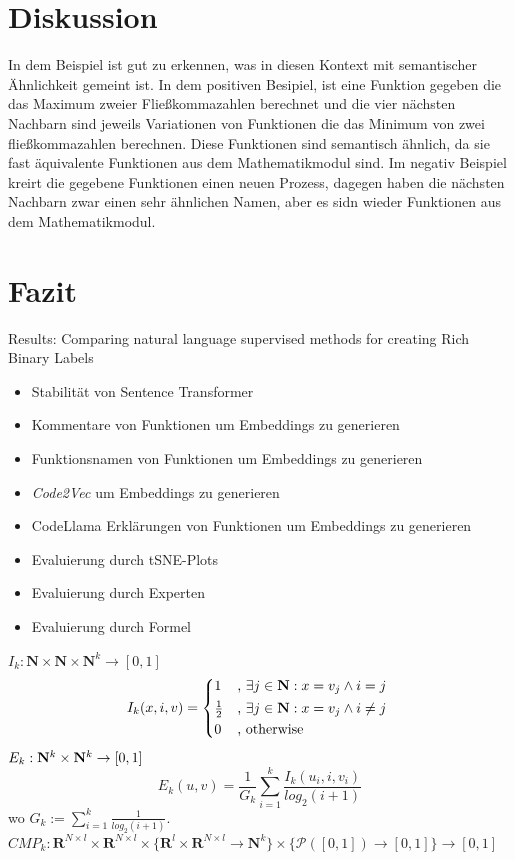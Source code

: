 \documentclass[12pt,letterpaper,ngerman]{article}
\begin{document}
\section{Diskussion}

In dem Beispiel ist gut zu erkennen, was in diesen Kontext mit semantischer
Ähnlichkeit gemeint ist. In dem positiven Besipiel, ist eine Funktion gegeben
die das Maximum zweier Fließkommazahlen berechnet und die vier
nächsten Nachbarn sind jeweils Variationen von Funktionen die das
Minimum von zwei fließkommazahlen berechnen. Diese Funktionen sind
semantisch ähnlich, da sie fast äquivalente Funktionen aus dem
Mathematikmodul sind. Im negativ Beispiel kreirt die 
gegebene Funktionen einen neuen Prozess, dagegen haben die nächsten
Nachbarn zwar einen sehr ähnlichen Namen, aber es sidn wieder Funktionen
aus dem Mathematikmodul.\\
\section{Fazit}

Results: Comparing natural language supervised methods for creating Rich Binary Labels
\begin{itemize}
  \item Stabilität von Sentence Transformer
  \item Kommentare von Funktionen um Embeddings zu generieren
  \item Funktionsnamen von Funktionen um Embeddings zu generieren
  \item \textit{Code2Vec} um Embeddings zu generieren
  \item CodeLlama Erklärungen von Funktionen um Embeddings zu generieren
  \item Evaluierung durch tSNE-Plots
  \item Evaluierung durch Experten
  \item Evaluierung durch Formel
\end{itemize}
$ I_{k}: \mathbf{N} \times \mathbf{N} \times \mathbf{N}^{k} \to [0,1]$
\[ I_{k}(x,i,v) = \begin{cases*} 
1 & , $\exists j \in \mathbf{N}: x = v_j \land i = j$   \\
      \frac{1}{2} & , $\exists j \in \mathbf{N}: x = v_j \land i \neq j$\\
      0   & , \text{otherwise}
                \end{cases*} \]
$E_k: \mathbf{N}^k \times \mathbf{N}^k \to [0,1]$
\[ E_k(u,v) = \frac{1}{G_k} \sum^{k}_{i=1} \frac{I_k(u_i,i,v_i)}{log_2(i+1)}\]
wo $G_k := \sum_{i=1}^{k} \frac{1}{log_2(i+1)}$.\\
$CMP_k: \mathbf{R}^{N\times l} \times \mathbf{R}^{N\times l} \times 
\{ \mathbf{R}^l \times \mathbf{R}^{N\times l} \to \mathbf{N}^k \} 
\times \{ \mathcal{P}([0,1]) \to [0,1] \} \to [0,1]$
\end{document}
